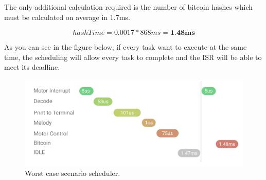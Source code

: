 \documentclass{article}
\begin{document}
\bigskip

\noindent
The only additional calculation required is the number of bitcoin hashes which must be calculated on average in 1.7ms.

\[hashTime = 0.0017 * 868ms = \textbf{1.48ms}\]

\noindent
As you can see in the figure below, if every task want to execute at the same time, the scheduling will allow every task to complete and the ISR will be able to meet its deadline.


\begin{figure}[H]
\begin{center}
   \includegraphics[width=0.9\linewidth]{scheduler.png}
\end{center}
   \caption{Worst case scenario scheduler.}
\label{fig:long}
\label{fig:onecol}
\end{figure}
\end{document}
